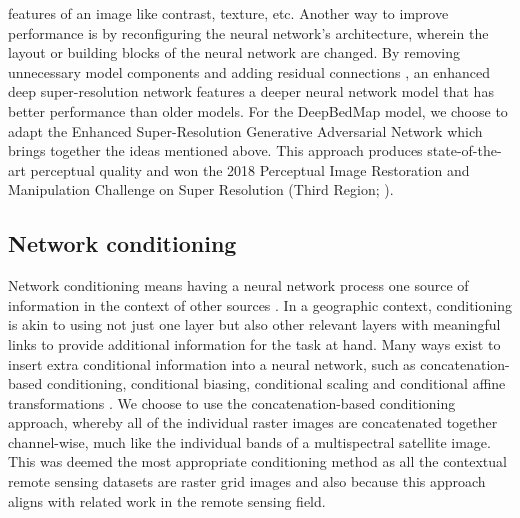 \documentclass[tc, noline]{copernicus}
\begin{document}
features of an image like contrast, texture, etc. Another way to improve performance is by reconfiguring the neural network's architecture, wherein
the layout or building blocks of the neural network are changed. By removing unnecessary model components and adding residual connections
\citep{HeDeepResidualLearning2015}, an enhanced deep super-resolution network \citep[EDSR;][]{LimEnhancedDeepResidual2017} features a deeper neural
network model that has better performance than older models. For the DeepBedMap model, we choose to adapt the Enhanced Super-Resolution Generative
Adversarial Network \citep[ESRGAN;][]{WangESRGANEnhancedSuperResolution2019} which brings together the ideas mentioned above. This approach produces
state-of-the-art perceptual quality and won the 2018 Perceptual Image Restoration and Manipulation Challenge on Super Resolution (Third Region; \citealp{Blau2018PIRMChallenge2018}).


\subsection{Network conditioning}\label{section:networkconditioning}

Network conditioning means having a neural network process one source of information in the context of other sources
\citep{DumoulinFeaturewisetransformations2018}. In a geographic context, conditioning is akin to using not just one layer but also other relevant
layers with meaningful links to provide additional information for the task at hand. Many ways exist to insert extra conditional information into a
neural network, such as concatenation-based conditioning, conditional biasing, conditional scaling and conditional affine transformations
\citep{DumoulinFeaturewisetransformations2018}. We choose to use the concatenation-based conditioning approach, whereby all of the individual raster
images are concatenated together channel-wise, much like the individual bands of a multispectral satellite image. This was deemed the most appropriate
conditioning method as all the contextual remote sensing datasets are raster grid images and also because this approach aligns with related work in
the remote sensing field.
\end{document}
